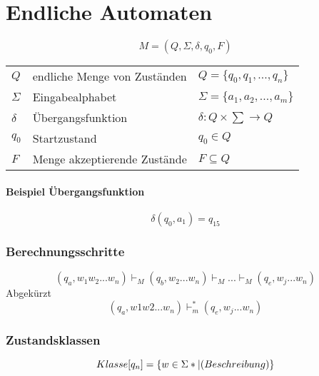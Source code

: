 
\section{Endliche Automaten}
%
\[
M = (Q, \Sigma, \delta, q_0, F)
\]
\begin{tabular}{lll}
	\(Q\)		& endliche Menge von Zuständen	& \(Q=\{q_0,q_1,...,q_n\}\)\\
	\(\Sigma\)	& Eingabealphabet				& \(\Sigma = \{a_1,a_2,...,a_m\}\)\\
	\(\delta\)	& Übergangsfunktion				& \(\delta: Q \times \sum \rightarrow Q\)\\
	\(q_0\)		& Startzustand					& \(q_0 \in Q\)\\
	\(F\)		& Menge akzeptierende Zustände	& \(F \subseteq Q\) \\
\end{tabular}

\paragraph{Beispiel Übergangsfunktion}
\[
	\delta (q_0,a_1) = q_15
\]

\subsubsection{Berechnungsschritte}
\[
	(q_a,w_1w_2...w_n) \vdash_M (q_b,w_2...w_n) \vdash_M ... \vdash_M (q_e,w_j...w_n)
\]
Abgekürzt
\[
	(q_a,w1w2...w_n) \vdash_m^* (q_e,w_j...w_n)
\]

\subsubsection{Zustandsklassen}
\[
Klasse[q_n]  = \{w \in \Sigma* | \text(Beschreibung)\}
\]